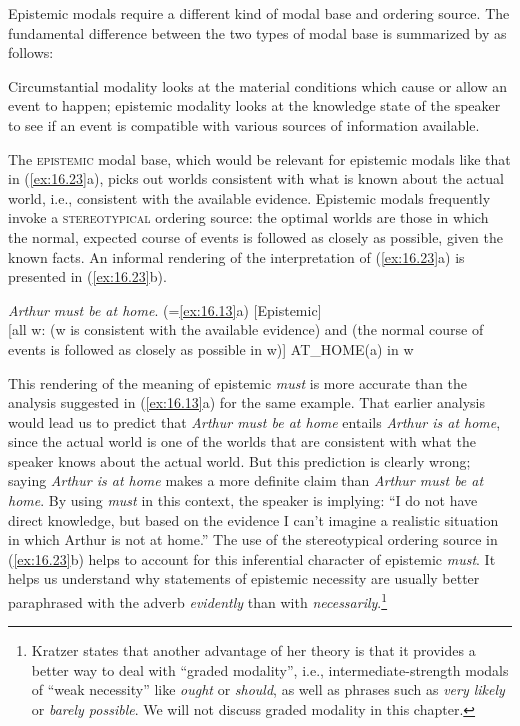 Epistemic modals require a different kind of modal base and ordering source. The fundamental difference between the two types of modal base is summarized by \citet[1494]{Hacquard2011} as follows:


\begin{modquote}
Circumstantial modality looks at the material conditions which cause or allow an event to happen; epistemic modality looks at the knowledge state of the speaker to see if an event is compatible with various sources of information available.
\end{modquote}
 

The \textsc{epistemic} modal base, which would be relevant for epistemic modals like that in (\ref{ex:16.23}a), picks out worlds consistent with what is known about the actual world, i.e., consistent with the available evidence. Epistemic modals frequently invoke a \textsc{stereotypical} ordering source: the optimal worlds are those in which the normal, expected course of events is followed as closely as possible, given the known facts. An informal rendering of the interpretation of (\ref{ex:16.23}a) is presented in (\ref{ex:16.23}b).


\ea \label{ex:16.23}
\ea  \textit{Arthur must be at home}. (=\ref{ex:16.13}a) \hfill [Epistemic]  \\
\ex{} [all w: (w is consistent with the available evidence) and (the normal course of events is followed as closely as possible in w)] AT\_HOME(a) in w
\z
\z
 
\largerpage[-1]
This rendering of the meaning of epistemic \textit{must} is more accurate than the analysis suggested in (\ref{ex:16.13}a) for the same example. That earlier analysis would lead us to predict that \textit{Arthur must be at home} entails \textit{Arthur is at home}, since the actual world is one of the worlds that are consistent with what the speaker knows about the actual world. But this prediction is clearly wrong; saying \textit{Arthur is at home} makes a more definite claim than \textit{Arthur must be at home}. By using \textit{must} in this context, the speaker is implying: “I do not have direct knowledge, but based on the evidence I can’t imagine a realistic situation in which Arthur is not at home.” The use of the stereotypical ordering source in (\ref{ex:16.23}b) helps to account for this inferential character of epistemic \textit{must}. It helps us understand why statements of epistemic necessity are usually better paraphrased with the adverb \textit{evidently} than with \textit{necessarily}.\footnote{Kratzer states that another advantage of her theory is that it provides a better way to deal with “graded modality”, i.e., intermediate-strength modals of “weak necessity” like \textit{ought} or \textit{should}, as well as phrases such as \textit{very likely} or \textit{barely possible}. We will not discuss graded modality in this chapter.}



